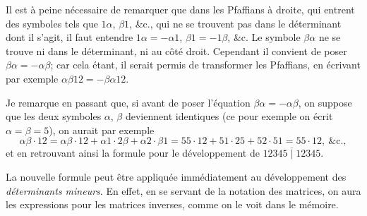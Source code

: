 \documentclass[11pt,a4paper]{article}
\begin{document}
\medskip

Il est \`a peine n\'ecessaire de remarquer que dans les Pfaffians \`a droite, qui entrent des symboles tels que $1\alpha$, $\beta 1$, \&c., qui ne se trouvent pas dans le d\'eterminant dont il s'agit, il faut entendre $1\alpha = -\alpha 1$, $\beta 1 = -1\beta$, \&c. Le symbole $\beta\alpha$ ne se trouve ni dans le d\'eterminant, ni au c\^ot\'e droit. Cependant il convient de poser $\beta\alpha = -\alpha\beta$; car cela \'etant, il serait permis de transformer les Pfaffians, en \'ecrivant par exemple $\alpha\beta 12 = -\beta\alpha 12$.

\medskip

Je remarque en passant que, si avant de poser l'\'equation $\beta\alpha = -\alpha\beta$, on suppose que les deux symboles $\alpha$, $\beta$ deviennent identiques (ce pour exemple on \'ecrit $\alpha = \beta = 5$), on aurait par exemple
\[
\alpha\beta\cdot 12 = \alpha\beta\cdot 12 + \alpha 1\cdot 2\beta + \alpha 2\cdot \beta 1 = 55\cdot 12 + 51\cdot 25 + 52\cdot 51 = 55\cdot 12,\ \&\mathrm{c}.,
\]
et en retrouvant ainsi la formule pour le d\'eveloppement de $\overline{12345 \mid 12345}$.

\medskip

La nouvelle formule peut \^etre appliqu\'ee imm\'ediatement au d\'eveloppement des \textit{d\'eterminants mineurs}. En effet, en se servant de la notation des matrices, on aura les expressions pour les matrices inverses, comme on le voit dans le m\'emoire.

\medskip
\end{document}
